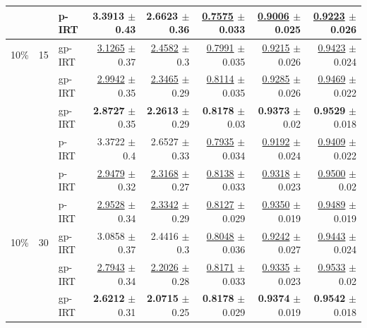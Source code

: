 \begin{longtable}{llp{}rrrrr}
 &  & p-IRT & \textbf{3.3913} {\scriptsize $\pm$ 0.43} & \textbf{2.6623} {\scriptsize $\pm$ 0.36} & \underline{0.7575} {\scriptsize $\pm$ 0.033} & \underline{0.9006} {\scriptsize $\pm$ 0.025} & \underline{0.9223} {\scriptsize $\pm$ 0.026} \\
\midrule
10\% & 15 & gp-IRT & \underline{3.1265} {\scriptsize $\pm$ 0.37} & \underline{2.4582} {\scriptsize $\pm$ 0.3} & \underline{0.7991} {\scriptsize $\pm$ 0.035} & \underline{0.9215} {\scriptsize $\pm$ 0.026} & \underline{0.9423} {\scriptsize $\pm$ 0.024} \\
 &  & gp-IRT & \underline{2.9942} {\scriptsize $\pm$ 0.35} & \underline{2.3465} {\scriptsize $\pm$ 0.29} & \underline{0.8114} {\scriptsize $\pm$ 0.035} & \underline{0.9285} {\scriptsize $\pm$ 0.026} & \underline{0.9469} {\scriptsize $\pm$ 0.022} \\
 &  & gp-IRT & \textbf{2.8727} {\scriptsize $\pm$ 0.35} & \textbf{2.2613} {\scriptsize $\pm$ 0.29} & \textbf{0.8178} {\scriptsize $\pm$ 0.03} & \textbf{0.9373} {\scriptsize $\pm$ 0.02} & \textbf{0.9529} {\scriptsize $\pm$ 0.018} \\
 &  & p-IRT & 3.3722 {\scriptsize $\pm$ 0.4} & 2.6527 {\scriptsize $\pm$ 0.33} & \underline{0.7935} {\scriptsize $\pm$ 0.034} & \underline{0.9192} {\scriptsize $\pm$ 0.024} & \underline{0.9409} {\scriptsize $\pm$ 0.022} \\
 &  & p-IRT & \underline{2.9479} {\scriptsize $\pm$ 0.32} & \underline{2.3168} {\scriptsize $\pm$ 0.27} & \underline{0.8138} {\scriptsize $\pm$ 0.033} & \underline{0.9318} {\scriptsize $\pm$ 0.023} & \underline{0.9500} {\scriptsize $\pm$ 0.02} \\
 &  & p-IRT & \underline{2.9528} {\scriptsize $\pm$ 0.34} & \underline{2.3342} {\scriptsize $\pm$ 0.29} & \underline{0.8127} {\scriptsize $\pm$ 0.029} & \underline{0.9350} {\scriptsize $\pm$ 0.019} & \underline{0.9489} {\scriptsize $\pm$ 0.019} \\
\midrule
10\% & 30 & gp-IRT & 3.0858 {\scriptsize $\pm$ 0.37} & 2.4416 {\scriptsize $\pm$ 0.3} & \underline{0.8048} {\scriptsize $\pm$ 0.036} & \underline{0.9242} {\scriptsize $\pm$ 0.027} & \underline{0.9443} {\scriptsize $\pm$ 0.024} \\
 &  & gp-IRT & \underline{2.7943} {\scriptsize $\pm$ 0.34} & \underline{2.2026} {\scriptsize $\pm$ 0.28} & \underline{0.8171} {\scriptsize $\pm$ 0.033} & \underline{0.9335} {\scriptsize $\pm$ 0.023} & \underline{0.9533} {\scriptsize $\pm$ 0.02} \\
 &  & gp-IRT & \textbf{2.6212} {\scriptsize $\pm$ 0.31} & \textbf{2.0715} {\scriptsize $\pm$ 0.25} & \textbf{0.8178} {\scriptsize $\pm$ 0.029} & \textbf{0.9374} {\scriptsize $\pm$ 0.019} & \textbf{0.9542} {\scriptsize $\pm$ 0.018} \\

\end{longtable}
